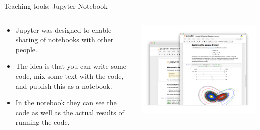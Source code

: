 \documentclass[11pt]{beamer}
\begin{document}
\begin{frame}{Teaching tools: Jupyter Notebook}
\begin{columns}[T] %
\begin{column}{.48\textwidth}
		\begin{itemize}
			\item Jupyter was designed to enable sharing of notebooks with other people. 
			\item The idea is that you can write some code, mix some text with the code, and publish this as a notebook.  
\item In the notebook they can see the code as well as the actual results of running the code.
		\end{itemize}
\end{column}%
\hfill%
\begin{column}{.48\textwidth}
		\includegraphics[width=\linewidth]{../05-pictures/lesson-1-1_pic_26.PNG}
\end{column}%
\end{columns}
\end{frame}
\end{document}
